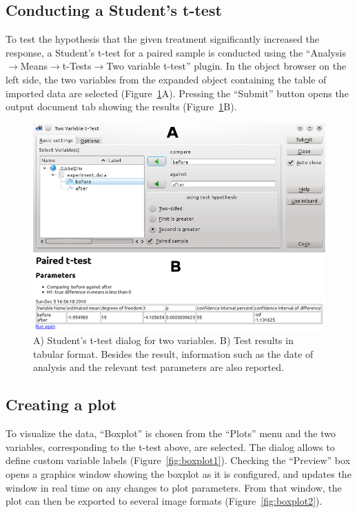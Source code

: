 \subsection{Conducting a Student's t-test}
\label{sec:conducting_ttest}
To test the hypothesis that the given treatment significantly increased the response, a Student's
t-test for a paired sample is conducted using the 
``Analysis$\rightarrow$Means$\rightarrow$t-Tests$\rightarrow$Two variable t-test'' plugin. 
In the object browser on the left side, the two variables from the expanded
 object containing the table of imported data 
are selected (Figure~\ref{fig:t_test}A). 
Pressing the ``Submit'' button opens the output document tab
showing the results (Figure~\ref{fig:t_test}B).

\begin{figure}[htp]
 \centering
 \includegraphics[width=15.5cm]{../figures/t-test.png}
 \caption{A) Student's t-test dialog for two variables. B) Test results in tabular  format. 
Besides the result, information such as the date of analysis and the relevant test parameters are also reported.}
 \label{fig:t_test}
\end{figure}



\subsection{Creating a plot}
\label{sec:create_plot}
To visualize the data, ``Boxplot'' is chosen from the ``Plots'' menu
and the two variables, corresponding to the t-test above, are selected.
The dialog allows to define custom variable labels (Figure~\ref{fig:boxplot1}).
Checking the ``Preview'' box opens a graphics window showing the boxplot as
it is configured, and updates the window in real time on any changes to plot parameters. From
that window, the plot can then be exported to several image formats (Figure~\ref{fig:boxplot2}).

